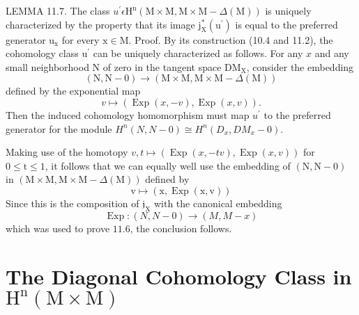\documentclass[10pt]{article}
\begin{document}
LEMMA 11.7. The class $u^{\prime} \epsilon \mathrm{H}^{\mathrm{n}}(\mathrm{M} \times \mathrm{M}, \mathrm{M} \times \mathrm{M}-\Delta(\mathrm{M}))$ is uniquely characterized by the property that its image $\mathrm{j}_{\mathrm{X}}^{*}\left(\mathrm{u}^{\prime}\right)$ is equal to the preferred generator $\mathrm{u}_{\mathrm{x}}$ for every $\mathrm{x} \in \mathrm{M}$. Proof. By its construction (10.4 and 11.2), the cohomology class $\mathrm{u}^{\prime}$ can be uniquely characterized as follows. For any $x$ and any small neighborhood $\mathrm{N}$ of zero in the tangent space $\mathrm{DM}_{\mathrm{X}}$, consider the embedding
$$
(\mathrm{N}, \mathrm{N}-0) \rightarrow(\mathrm{M} \times \mathrm{M}, \mathrm{M} \times \mathrm{M}-\Delta(\mathrm{M}))
$$
defined by the exponential map
$$
v \mapsto(\operatorname{Exp}(x,-v), \operatorname{Exp}(x, v)) .
$$
Then the induced cohomology homomorphism must map $u^{\prime}$ to the preferred generator for the module $H^{n}(N, N-0) \cong H^{n}\left(D_{x}, D M_{x}-0\right)$.

Making use of the homotopy $v, t \mapsto(\operatorname{Exp}(x,-t v), \operatorname{Exp}(x, v))$ for $0 \leq \mathrm{t} \leq 1$, it follows that we can equally well use the embedding of $(\mathrm{N}, \mathrm{N}-0)$ in $(\mathrm{M} \times \mathrm{M}, \mathrm{M} \times \mathrm{M}-\Delta(\mathrm{M}))$ defined by
$$
\mathrm{v} \mapsto(\mathrm{x}, \operatorname{Exp}(\mathrm{x}, \mathrm{v}))
$$
Since this is the composition of $\mathfrak{j}_{\mathrm{X}}$ with the canonical embedding
$$
\operatorname{Exp}:(N, N-0) \rightarrow(M, M-x)
$$
which was used to prove $11.6$, the conclusion follows.

\section{The Diagonal Cohomology Class in $\mathrm{H}^{\mathrm{n}}(\mathrm{M} \times \mathrm{M})$}
\end{document}
